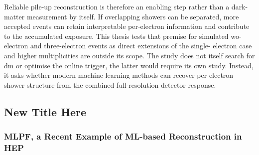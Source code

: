 Reliable pile-up reconstruction is therefore an enabling step rather than a
dark-matter measurement by itself. If overlapping showers can be separated,
more accepted events can retain interpretable per-electron information and
contribute to the accumulated exposure. This thesis tests that premise for
simulated wo-electron and three-electron events as direct extensions of the single-
electron case and higher multiplicities are outside its scope. The study
does not itself search for \gls{dm} or optimise the online trigger, the latter would require its own study. Instead, it asks whether modern
machine-learning methods can recover per-electron shower structure from the
combined full-resolution detector response.


\subsection{New Title Here}



\subsubsection{MLPF, a Recent Example of ML-based Reconstruction in HEP}




